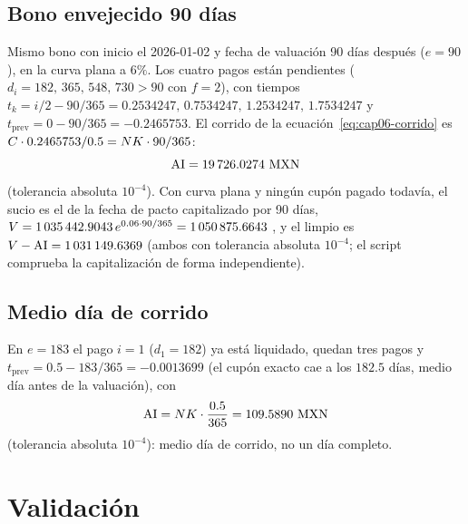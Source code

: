 \subsection{Bono envejecido 90 días}

Mismo bono con inicio el 2026-01-02 y fecha de valuación 90 días después ($e=90$), en la curva plana a $6\%$.
Los cuatro pagos están pendientes ($d_i=182,\,365,\,548,\,730>90$ con $f=2$), con tiempos
$t_k=i/2-90/365=0.2534247,\,0.7534247,\,1.2534247,\,1.7534247$ y $t_{\mathrm{prev}}=0-90/365=-0.2465753$. El
corrido de la ecuación~\eqref{eq:cap06-corrido} es $C\cdot0.2465753/0.5=\Nom\K\cdot90/365$:
\[
  \mathrm{AI}=\verif{cap06-corrido}{19726.0274}\ \MXN
\]
(tolerancia absoluta $10^{-4}$). Con curva plana y ningún cupón pagado todavía, el sucio es el de la fecha de
pacto capitalizado por 90 días,
$V=1\,035\,442.9043\,e^{0.06\cdot90/365}=\verif{cap06-precio-sucio-envejecido}{1050875.6643}$ \MXN, y el limpio es
$V-\mathrm{AI}=\verif{cap06-precio-limpio}{1031149.6369}$ \MXN (ambos con tolerancia absoluta $10^{-4}$; el script
comprueba la capitalización de forma independiente).

\subsection{Medio día de corrido}

En $e=183$ el pago $i=1$ ($d_1=182$) ya está liquidado, quedan tres pagos y $t_{\mathrm{prev}}=0.5-183/365=
-0.0013699$ (el cupón exacto cae a los $182.5$ días, medio día antes de la valuación), con
\[
  \mathrm{AI}=\Nom\K\cdot\frac{0.5}{365}=\verif{cap06-corrido-dia-183}{109.5890}\ \MXN
\]
(tolerancia absoluta $10^{-4}$): medio día de corrido, no un día completo.

\section{Validación}\label{sec:cap06-validacion}

